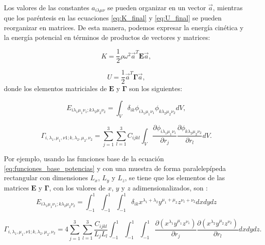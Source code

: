 \documentclass[12pt]{article}
\begin{document}
Los valores de las constantes $a_{i \lambda \mu \nu}$ se pueden organizar en un vector $\vec{a}$, mientras que los paréntesis en las ecuaciones \ref{eq:K_final} y \ref{eq:U_final} se pueden reorganizar en matrices. De esta manera, podemos expresar la energía cinética y la energía potencial en términos de productos de vectores y matrices: 

\begin{equation}
	K = \frac{1}{2} \rho \omega^2 \vec{a}^{T}\bm{E}\vec{a},
	\label{eq:K_matrix}
\end{equation}

\begin{equation}
	U = \frac{1}{2} \vec{a}^{T}\bm{\Gamma}\vec{a},
\end{equation}
donde los elementos matriciales de $\bm{E}$ y $\bm{\Gamma}$ son los siguientes:

\begin{equation}
	E_{i \lambda_1 \mu_1 \nu_1; k \lambda_2 \mu_2 \nu_2} = \int_{V}{\delta_{ik} \phi_{i \lambda_1 \mu_1 \nu_1}  \phi_{k \lambda_2 \mu_2 \nu_2} dV},
	\label{eq:matriz_E}
\end{equation}

\begin{equation}
    \Gamma_{i, \lambda_1, \mu_1,  \nu1; k, \lambda_2, \mu_2, \nu_2} = \sum_{j=1}^{3} \sum_{l=1}^{3} {C_{ijkl} \int_{V}{\frac{\partial \phi_{i \lambda_{1} \mu_1 \nu_1}}{\partial r_j} \frac{\partial \phi_{k \lambda_2 \mu_2 \nu_2}}{\partial r_l} dV}}.
	\label{eq:matriz_gamma}
\end{equation}

Por ejemplo, usando las funciones base de la ecuación \ref{eq:funciones_base_potencias} y con una muestra de forma paralelepípeda rectangular con dimensiones $L_x$, $L_y$ y $L_z$, se tiene que los elementos de las matrices $\bm{E}$ y $\bm{\Gamma}$, con los valores de $x$, $y$ y $z$ adimensionalizados, son \cite{Ohno}:
\begin{equation}
	E_{i \lambda_1 \mu_1 \nu_1; k \lambda_2 \mu_2 \nu_2} = \int_{-1}^{1} \int_{-1}^{1} \int_{-1}^{1} {\delta_{ik} x^{\lambda_1 + \lambda_2} y^{\mu_1 + \mu_2} z^{\nu_1 + \nu_2} dx dy dz}
	\label{eq:matriz_E_paralelepípedo_pot}
\end{equation}

\begin{equation}
    \Gamma_{i, \lambda_1, \mu_1,  \nu1; k, \lambda_2, \mu_2, \nu_2} = 4\sum_{j=1}^{3} \sum_{l=1}^{3} \frac{C_{ijkl}}{L_j L_l} \int_{-1}^{1} \int_{-1}^{1} \int_{-1}^{1} {\frac{\partial (x^{\lambda_1} y^{\mu_1} z^{\nu_1})}{\partial r_j} \frac{\partial (x^{\lambda_2} y^{\mu_2} z^{\nu_2})}{\partial r_l} dx dy dz}.
	\label{eq:matriz_gamma_paralelepípedo_pot}
\end{equation}
\end{document}
